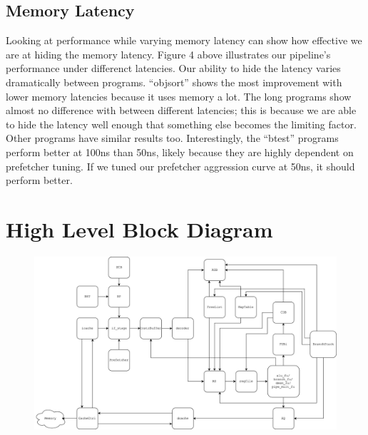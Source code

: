 \documentclass[10pt,journal,compsoc]{IEEEtran}
\begin{document}
\subsection{Memory Latency}
Looking at performance while varying memory latency can show how effective we are at hiding the memory latency. Figure 4 above illustrates our pipeline's performance under differenct latencies. Our ability to hide the latency varies dramatically between programs. ``objsort'' shows the most improvement with lower memory latencies because it uses memory a lot. The \textunderscore long programs show almost no difference with between different latencies; this is because we are able to hide the latency well enough that something else becomes the limiting factor. Other programs have similar results too. Interestingly, the ``btest'' programs perform better at 100ns than 50ns, likely because they are highly dependent on prefetcher tuning. If we tuned our prefetcher aggression curve at 50ns, it should perform better.

\appendices
\section{High Level Block Diagram}
\begin{figure}[!htb]
\centering
\includegraphics[width=\textwidth]{blocks}
\end{figure}

\end{document}
